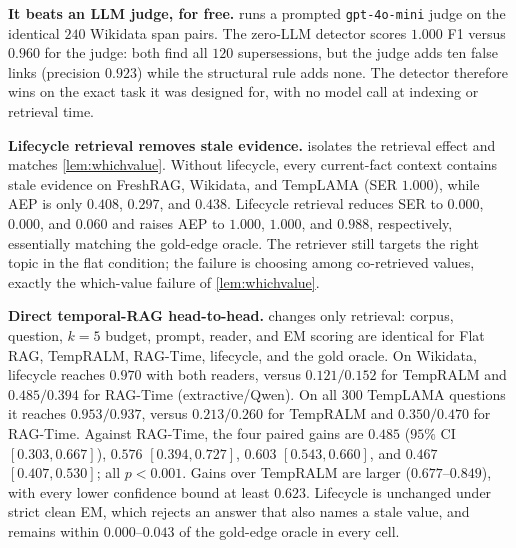 \documentclass[letterpaper]{article}
\theoremstyle{plain}
\begin{document}


\noindent\textbf{It beats an LLM judge, for free.}  runs a prompted \texttt{gpt-4o-mini} judge on the identical $240$ Wikidata span pairs. The zero-LLM detector scores $1.000$ F1 versus $0.960$ for the judge: both find all $120$ supersessions, but the judge adds ten false links (precision $0.923$) while the structural rule adds none. The detector therefore wins on the exact task it was designed for, with no model call at indexing or retrieval time.



\noindent\textbf{Lifecycle retrieval removes stale evidence.}  isolates the retrieval effect and matches \cref{lem:whichvalue}. Without lifecycle, every current-fact context contains stale evidence on FreshRAG, Wikidata, and TempLAMA (SER $1.000$), while AEP is only $0.408$, $0.297$, and $0.438$. Lifecycle retrieval reduces SER to $0.000$, $0.000$, and $0.060$ and raises AEP to $1.000$, $1.000$, and $0.988$, respectively, essentially matching the gold-edge oracle. The retriever still targets the right topic in the flat condition; the failure is choosing among co-retrieved values, exactly the which-value failure of \cref{lem:whichvalue}.

\noindent\textbf{Direct temporal-RAG head-to-head.}  changes only retrieval: corpus, question, $k{=}5$ budget, prompt, reader, and EM scoring are identical for Flat RAG, TempRALM, RAG-Time, lifecycle, and the gold oracle. On Wikidata, lifecycle reaches $0.970$ with both readers, versus $0.121/0.152$ for TempRALM and $0.485/0.394$ for RAG-Time (extractive/Qwen). On all $300$ TempLAMA questions it reaches $0.953/0.937$, versus $0.213/0.260$ for TempRALM and $0.350/0.470$ for RAG-Time. Against RAG-Time, the four paired gains are $0.485$ ($95\%$ CI $[0.303,0.667]$), $0.576$ $[0.394,0.727]$, $0.603$ $[0.543,0.660]$, and $0.467$ $[0.407,0.530]$; all $p<0.001$. Gains over TempRALM are larger ($0.677$--$0.849$), with every lower confidence bound at least $0.623$. Lifecycle is unchanged under strict clean EM, which rejects an answer that also names a stale value, and remains within $0.000$--$0.043$ of the gold-edge oracle in every cell.
\end{document}
